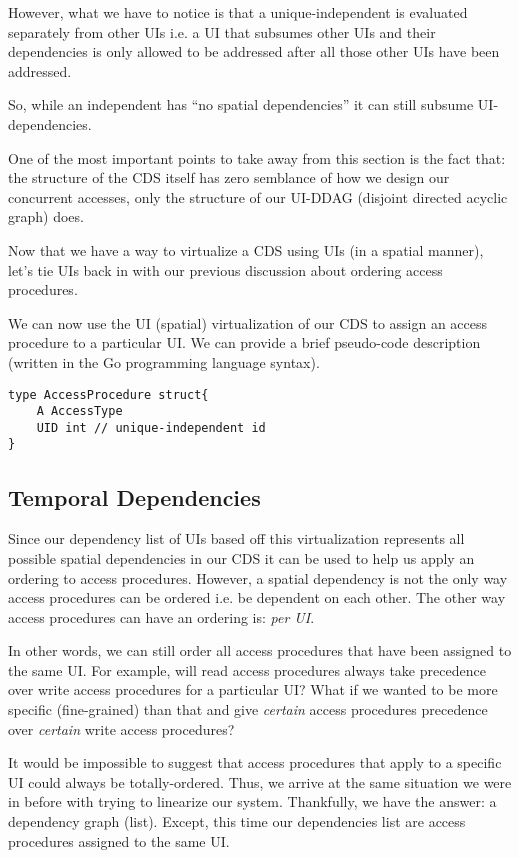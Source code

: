However, what we have to notice is that a unique-independent is evaluated separately from other UIs i.e. a UI that subsumes other UIs and their dependencies is only allowed to be addressed after all those other UIs have been addressed.

So, while an independent has ``no spatial dependencies'' it can still subsume UI-dependencies. 

One of the most important points to take away from this section is the fact that: the structure of the CDS itself has zero semblance of how we design our concurrent accesses, only the structure of our UI-DDAG (disjoint directed acyclic graph) does.

Now that we have a way to virtualize a CDS using UIs (in a spatial manner), let's tie UIs back in with our previous discussion about ordering access procedures.

We can now use the UI (spatial) virtualization of our CDS to assign an access procedure to a particular UI. We can provide a brief pseudo-code description (written in the Go programming language syntax).

\begin{verbatim}
type AccessProcedure struct{
	A AccessType
	UID int // unique-independent id
}
\end{verbatim}

\subsection{Temporal Dependencies}

Since our dependency list of UIs based off this virtualization represents all possible spatial dependencies in our CDS it can be used to help us apply an ordering to access procedures. However, a spatial dependency is not the only way access procedures can be ordered i.e. be dependent on each other. The other way access procedures can have an ordering is: \textit{per UI}.

In other words, we can still order all access procedures that have been assigned to the same UI. For example, will read access procedures always take precedence over write access procedures for a particular UI? What if we wanted to be more specific (fine-grained) than that and give \textit{certain} access procedures precedence over \textit{certain} write access procedures?

It would be impossible to suggest that access procedures that apply to a specific UI could always be totally-ordered. Thus, we arrive at the same situation we were in before with trying to linearize our system. Thankfully, we have the answer: a dependency graph (list). Except, this time our dependencies list are access procedures assigned to the same UI. 


